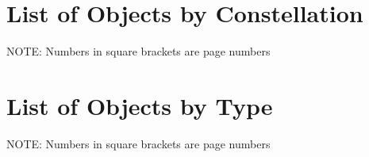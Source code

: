\documentclass[oneside]{book}
\begin{document}
\author{The Astronomy Logbook Project}










\mainmatter







\twocolumn
\chapter{List of Objects by Constellation}
NOTE: Numbers in square brackets are page numbers \\



\chapter{List of Objects by Type}
NOTE: Numbers in square brackets are page numbers \\
\end{document}
